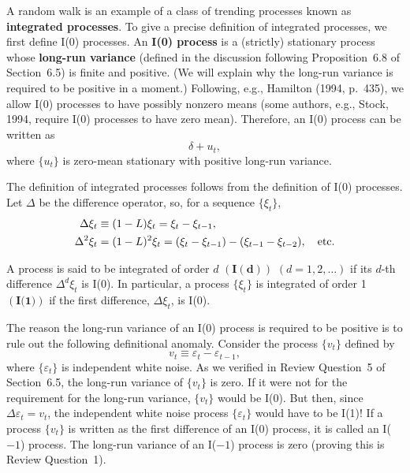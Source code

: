 A random walk is an example of a class of trending processes known as \textbf{integrated
processes}. To give a precise definition of integrated processes, we first define
I(0) processes. An \textbf{I(0) process} is a (strictly) stationary process whose \textbf{long-run
variance} (defined in the discussion following Proposition~6.8 of Section~6.5) is
finite and positive. (We will explain why the long-run variance is required to be
positive in a moment.) Following, e.g., Hamilton (1994, p.~435), we allow I(0)
processes to have possibly nonzero means (some authors, e.g., Stock, 1994, require
I(0) processes to have zero mean). Therefore, an I(0) process can be written as
\begin{equation}
\label{eq:9.1.1}
\delta + u_t,
\end{equation}
where $\{u_t\}$ is zero-mean stationary with positive long-run variance.

The definition of integrated processes follows from the definition of I(0) processes.
Let $\Delta$ be the difference operator, so, for a sequence $\{\xi_t\}$,
\begin{align}
\Delta \xi_t &\equiv (1 - L)\xi_t = \xi_t - \xi_{t-1}, \notag \\
\Delta^2 \xi_t &= (1 - L)^2 \xi_t = (\xi_t - \xi_{t-1}) - (\xi_{t-1} - \xi_{t-2}), \quad \text{etc.}
\label{eq:9.1.2}
\end{align}

\begin{definition}[I($d$) processes]
\label{def:9.1}
A process is said to be integrated of order $d$
$(\textbf{I}(\bm{d}))$ $(d = 1, 2, \ldots)$ if its $d$-th difference $\Delta^d \xi_t$ is I(0). In particular, a process
$\{\xi_t\}$ is integrated of order 1 $(\textbf{I(1)})$ if the first difference, $\Delta \xi_t$, is I(0).
\end{definition}

The reason the long-run variance of an I(0) process is required to be positive is
to rule out the following definitional anomaly. Consider the process $\{v_t\}$ defined by
\begin{equation}
\label{eq:9.1.3}
v_t \equiv \varepsilon_t - \varepsilon_{t-1},
\end{equation}
where $\{\varepsilon_t\}$ is independent white noise. As we verified in Review Question~5 of
Section~6.5, the long-run variance of $\{v_t\}$ is zero. If it were not for the requirement
for the long-run variance, $\{v_t\}$ would be I(0). But then, since $\Delta \varepsilon_t = v_t$, the independent white noise process $\{\varepsilon_t\}$ would have to be I(1)! If a process $\{v_t\}$ is written
as the first difference of an I(0) process, it is called an I($-1$) process. The long-run
variance of an I($-1$) process is zero (proving this is Review Question~1).

